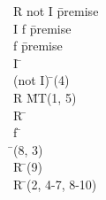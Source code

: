 \documentclass{article}
\begin{document}
\begin{proofbox}
\: R \rightarrow not I \= \hbox{premise} \\
\: I \lor f \= \hbox{premise} \\
\: \lnot f \= \hbox{premise} \\
\openAlt
\: I \= \asm \\
\: \lnot (not I) \= \doublenegintro(4) \\
\: \lnot R \= MT(1, 5) \\
\: \lnot R \=  \\
\splitAlt
\: f \= \asm \\
\: \bot \= \bottomintro(8, 3) \\
\: \lnot R \= \bottomelim(9) \\
\closeAlt
\: \lnot R \= \orelim(2, 4-7, 8-10) \\
\end{proofbox}
\end{document}
